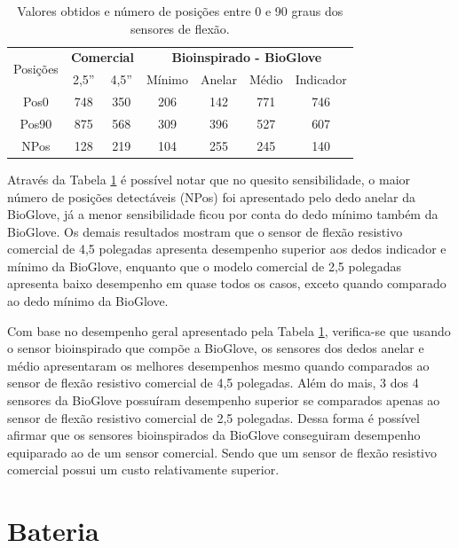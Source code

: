 \documentclass[
	12pt,				%
	openright,			%
	oneside,			%
	a4paper,			%
	english,			%
	brazil				%
	]{abntex2}
\begin{document}
\begin{table}[H]
	\centering	
	\caption{Valores obtidos e número de posições entre 0 e 90 graus dos sensores de flexão.}
		\begin{tabular}{c|cc|cccc} 
			\midrule
\multirow{2}{*}{Posições} & \multicolumn{2}{c|}{\textbf{Comercial}} & \multicolumn{4}{c}{\textbf{Bioinspirado - BioGlove}}\\
			    		& 2,5'' 	& 4,5'' 	& Mínimo 	& Anelar 	& Médio & Indicador \\
		  \midrule
			Pos0 		& 748 		& 350 		& 206 		&	142			&	771		&	746				\\
			Pos90 	& 875 		& 568 		& 309 		&	396			&	527		&	607				\\
			NPos 		& 128 		& 219 		& 104 		&	255			&	245		&	140				\\
		  \midrule
		\end{tabular}
	\label{Tab:NPos0-90}	
\end{table}

		Através da Tabela \ref{Tab:NPos0-90} é possível notar que no quesito sensibilidade, o maior número de posições detectáveis (NPos) foi apresentado pelo dedo anelar da BioGlove, já a menor sensibilidade ficou por conta do dedo mínimo também da BioGlove. Os demais resultados mostram que o sensor de flexão resistivo comercial de 4,5 polegadas apresenta desempenho superior aos dedos indicador e mínimo da BioGlove, enquanto que o modelo comercial de 2,5 polegadas apresenta baixo desempenho em quase todos os casos, exceto quando comparado ao dedo mínimo da BioGlove.

		Com base no desempenho geral apresentado pela Tabela \ref{Tab:NPos0-90}, verifica-se que usando o sensor bioinspirado que compõe a BioGlove, os sensores dos dedos anelar e médio apresentaram os melhores desempenhos mesmo quando comparados ao sensor de flexão resistivo comercial de 4,5 polegadas. Além do mais, 3 dos 4 sensores da BioGlove possuíram desempenho superior se comparados apenas ao sensor de flexão resistivo comercial de 2,5 polegadas. Dessa forma é possível afirmar que os sensores bioinspirados da BioGlove conseguiram desempenho equiparado ao de um sensor comercial. Sendo que um sensor de flexão resistivo comercial possui um custo relativamente superior.


			\section{Bateria}
\end{document}
